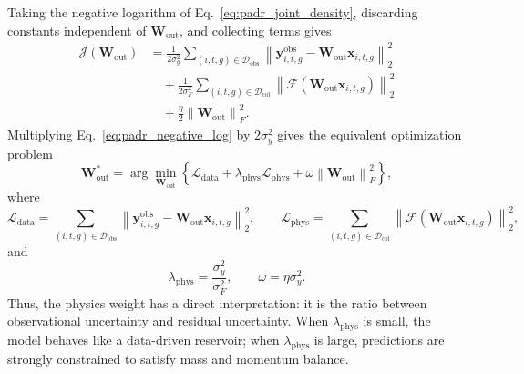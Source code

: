 \documentclass[pdflatex,sn-mathphys-ay]{sn-jnl}
\theoremstyle{thmstyleone}
\theoremstyle{thmstylethree}
\theoremstyle{thmstyletwo}
\begin{document}
Taking the negative logarithm of
Eq.~\eqref{eq:padr_joint_density}, discarding constants independent of
$\mathbf{W}_{\mathrm{out}}$, and collecting terms gives
\begin{align}
  \mathcal{J}
  \left(
    \mathbf{W}_{\mathrm{out}}
  \right)
  &=
  \frac{1}{2\sigma^{2}_{y}}
  \sum_{(i,t,g)\in\mathcal{D}_{\mathrm{obs}}}
  \left\|
    \mathbf{y}^{\mathrm{obs}}_{i,t,g}
    -
    \mathbf{W}_{\mathrm{out}}\mathbf{x}_{i,t,g}
  \right\|_{2}^{2}
  \nonumber \\
  &\quad+
  \frac{1}{2\sigma^{2}_{F}}
  \sum_{(i,t,g)\in\mathcal{D}_{\mathrm{col}}}
  \left\|
    \mathcal{F}
    \left(
      \mathbf{W}_{\mathrm{out}}\mathbf{x}_{i,t,g}
    \right)
  \right\|_{2}^{2}
  \nonumber \\
  &\quad+
  \frac{\eta}{2}
  \left\|
    \mathbf{W}_{\mathrm{out}}
  \right\|_{F}^{2}.
  \label{eq:padr_negative_log}
\end{align}
Multiplying Eq.~\eqref{eq:padr_negative_log} by
$2\sigma^{2}_{y}$ gives the equivalent optimization problem
\begin{equation}
  \mathbf{W}^{*}_{\mathrm{out}}
  =
  \arg\min_{\mathbf{W}_{\mathrm{out}}}
  \left\{
  \mathcal{L}_{\mathrm{data}}
  +
  \lambda_{\mathrm{phys}}
  \mathcal{L}_{\mathrm{phys}}
  +
  \omega
  \left\|
    \mathbf{W}_{\mathrm{out}}
  \right\|_{F}^{2}
  \right\},
  \label{eq:padr_map_objective}
\end{equation}
where
\begin{equation}
  \mathcal{L}_{\mathrm{data}}
  =
  \sum_{(i,t,g)\in\mathcal{D}_{\mathrm{obs}}}
  \left\|
    \mathbf{y}^{\mathrm{obs}}_{i,t,g}
    -
    \mathbf{W}_{\mathrm{out}}\mathbf{x}_{i,t,g}
  \right\|_{2}^{2},
  \qquad
  \mathcal{L}_{\mathrm{phys}}
  =
  \sum_{(i,t,g)\in\mathcal{D}_{\mathrm{col}}}
  \left\|
    \mathcal{F}
    \left(
      \mathbf{W}_{\mathrm{out}}\mathbf{x}_{i,t,g}
    \right)
  \right\|_{2}^{2},
  \label{eq:padr_loss_terms}
\end{equation}
and
\begin{equation}
  \lambda_{\mathrm{phys}}
  =
  \frac{\sigma^{2}_{y}}
  {\sigma^{2}_{F}},
  \qquad
  \omega
  =
  \eta\sigma^{2}_{y}.
  \label{eq:padr_weights}
\end{equation}
Thus, the physics weight has a direct interpretation: it is the ratio
between observational uncertainty and residual uncertainty.  When
$\lambda_{\mathrm{phys}}$ is small, the model behaves like a
data-driven reservoir; when $\lambda_{\mathrm{phys}}$ is large,
predictions are strongly constrained to satisfy mass and momentum
balance.
\end{document}
